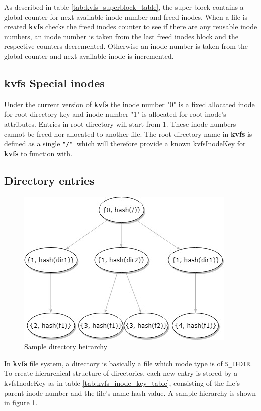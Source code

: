 \documentclass[bsc,frontabs,twoside,singlespacing,parskip,deptreport]{infthesis}     %
\begin{document}
{As described in table \ref{tab:kvfs_superblock_table}, the super block contains a global counter for next available inode number and freed inodes. When a file is created {\bf kvfs} checks the freed inodes counter to see if there are any reusable inode numbers, an inode number is taken from the last freed inodes block and the respective counters decremented. Otherwise an inode number is taken from the global counter and next available inode is incremented.

\subsection{kvfs Special inodes}
Under the current version of {\bf kvfs} the inode number "0" is a fixed allocated inode for root directory key and inode number "1" is allocated for root inode's attributes. Entries in root directory will start from 1. 
These inode numbers cannot be freed nor allocated to another file. 
The root directory name in {\bf kvfs} is defined as a single {\tt "/" }which will therefore provide a known kvfsInodeKey for {\bf kvfs} to function with. 

\subsection{Directory entries}
\begin{figure}
	\centering
	\includegraphics[scale=0.45]{diagrams/DirectoryHeirarchy.jpg}
	\caption{Sample directory heirarchy}
	 \label{fig:dir_hierarchy}
\end{figure}

In {\bf kvfs} file system, a directory is basically a file which mode type is of {\tt S\_IFDIR}. To create hierarchical structure of directories, each new entry is stored by a kvfsInodeKey as in table \ref{tab:kvfs_inode_key_table}, consisting of the file's parent inode number and the file's name hash value. A sample hierarchy is shown in figure \ref{fig:dir_hierarchy}.
\\
\\
}
\end{document}
